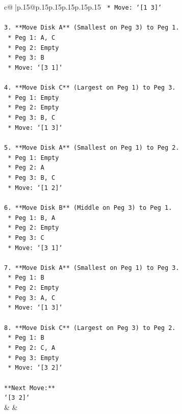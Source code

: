 \documentclass{article}
\begin{document}
{\begin{supertabular}{c@{$\;$}|p{.15\linewidth}@{}p{.15\linewidth}p{.15\linewidth}p{.15\linewidth}p{.15\linewidth}p{.15\linewidth}}
{{{\texttt{    *   Move: `{[}1 3{]}`} \\
\\ 
\texttt{3.  **Move Disk A** (Smallest on Peg 3) to Peg 1.} \\
\texttt{    *   Peg 1: A, C} \\
\texttt{    *   Peg 2: Empty} \\
\texttt{    *   Peg 3: B} \\
\texttt{    *   Move: `{[}3 1{]}`} \\
\\ 
\texttt{4.  **Move Disk C** (Largest on Peg 1) to Peg 3.} \\
\texttt{    *   Peg 1: Empty} \\
\texttt{    *   Peg 2: Empty} \\
\texttt{    *   Peg 3: B, C} \\
\texttt{    *   Move: `{[}1 3{]}`} \\
\\ 
\texttt{5.  **Move Disk A** (Smallest on Peg 1) to Peg 2.} \\
\texttt{    *   Peg 1: Empty} \\
\texttt{    *   Peg 2: A} \\
\texttt{    *   Peg 3: B, C} \\
\texttt{    *   Move: `{[}1 2{]}`} \\
\\ 
\texttt{6.  **Move Disk B** (Middle on Peg 3) to Peg 1.} \\
\texttt{    *   Peg 1: B, A} \\
\texttt{    *   Peg 2: Empty} \\
\texttt{    *   Peg 3: C} \\
\texttt{    *   Move: `{[}3 1{]}`} \\
\\ 
\texttt{7.  **Move Disk A** (Smallest on Peg 1) to Peg 3.} \\
\texttt{    *   Peg 1: B} \\
\texttt{    *   Peg 2: Empty} \\
\texttt{    *   Peg 3: A, C} \\
\texttt{    *   Move: `{[}1 3{]}`} \\
\\ 
\texttt{8.  **Move Disk C** (Largest on Peg 3) to Peg 2.} \\
\texttt{    *   Peg 1: B} \\
\texttt{    *   Peg 2: C, A} \\
\texttt{    *   Peg 3: Empty} \\
\texttt{    *   Move: `{[}3 2{]}`} \\
\\ 
\texttt{**Next Move:**} \\
\texttt{`{[}3 2{]}`} \\
            }
        }
    }
    & & \\ \\


\end{supertabular}}
\end{document}
